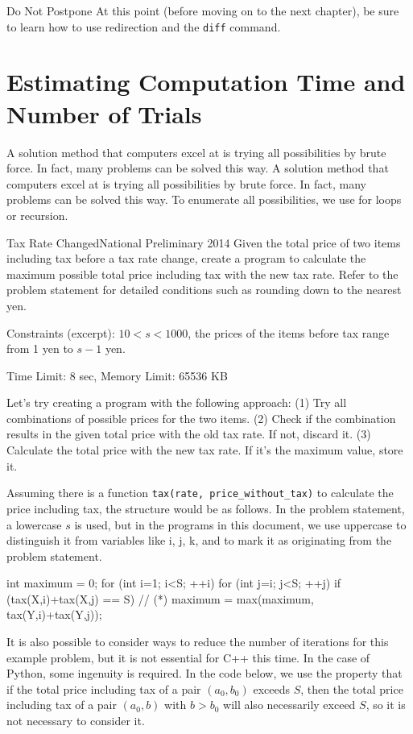 \begin{warningbox}{Do Not Postpone}
  At this point (before moving on to the next chapter), be sure to learn how to use redirection and the \texttt{diff} command.
\end{warningbox}
\section{Estimating Computation Time and Number of Trials}

A solution method that computers excel at is trying all possibilities by brute force. In fact, many problems can be solved this way.
A solution method that computers excel at is trying all possibilities by brute force. In fact, many problems can be solved this way.
To enumerate all possibilities, we use for loops or recursion.

\begin{pbox}{Tax Rate Changed}{National Preliminary 2014}
Given the total price of two items including tax before a tax rate change, create a program to calculate the maximum possible total price including tax with the new tax rate. Refer to the problem statement for detailed conditions such as rounding down to the nearest yen.

Constraints (excerpt): $10 < s < 1000$, the prices of the items before tax range from 1 yen to $s-1$ yen.

Time Limit: 8 sec, Memory Limit: 65536 KB

\end{pbox}

Let's try creating a program with the following approach: (1) Try all combinations of possible prices for the two items. (2) Check if the combination results in the given total price with the old tax rate. If not, discard it. (3) Calculate the total price with the new tax rate. If it's the maximum value, store it.

Assuming there is a function \texttt{tax(rate, price\_without\_tax)} to calculate the price including tax, the structure would be as follows. In the problem statement, a lowercase $s$ is used, but in the programs in this document, we use uppercase to distinguish it from variables like i, j, k, and to mark it as originating from the problem statement.
\begin{cbox}
  int maximum = 0;
  for (int i=1; i<S; ++i)
    for (int j=i; j<S; ++j) 
      if (tax(X,i)+tax(X,j) == S) // (*)
        maximum = max(maximum, tax(Y,i)+tax(Y,j));
\end{cbox}
It is also possible to consider ways to reduce the number of iterations for this example problem, but it is not essential for C++ this time.
In the case of Python, some ingenuity is required. In the code below, we use the property that if the total price including tax of a pair $(a_0, b_0)$ exceeds $S$, then the total price including tax of a pair $(a_0, b)$ with $b > b_0$ will also necessarily exceed $S$, so it is not necessary to consider it.

